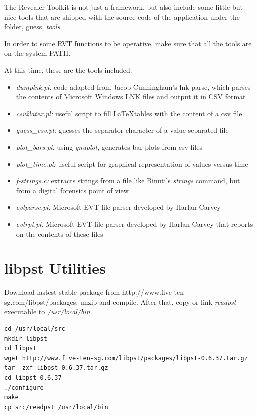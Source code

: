 \documentclass[a4paper,11pt,oneside]{report}
\begin{document}
The Revealer Toolkit is not just a framework, but also include some little but nice tools that are shipped with the source code of the application under the folder, guess, \emph{tools}. 

In order to some RVT functions to be operative, make sure that all the tools are on the system PATH.

At this time, these are the tools included:

\begin{itemize}
\item \emph{dumplnk.pl:} code adapted from Jacob Cunningham's lnk-parse, which parses the contents of Microsoft Windows LNK files and output it in CSV format
\item \emph{csv2latex.pl:} useful script to fill \LaTeX tables with the content of a csv file
\item \emph{guess\_csv.pl:} guesses the separator character of a value-separated file
\item \emph{plot\_bars.pl:} using \emph{gnuplot}, generates bar plots from csv files
\item \emph{plot\_time.pl:} useful script for graphical representation of values versus time
\item \emph{f-strings.c:} extracts strings from a file like Binutils \emph{strings}  command, but from a digital forensics point of view
\item \emph{evtparse.pl:} Microsoft EVT file parser developed by Harlan Carvey
\item \emph{evtrpt.pl:} Microsoft EVT file parser developed by Harlan Carvey that reports on the contents of these files
\end{itemize}




\section{libpst Utilities} \label{anx:libpst}

Download lastest stable package from http://www.five-ten-sg.com/libpst/packages, unzip and compile. After that, copy or link \emph{readpst} executable to \emph{/usr/local/bin}.

\begin{verbatim}
cd /usr/local/src
mkdir libpst
cd libpst
wget http://www.five-ten-sg.com/libpst/packages/libpst-0.6.37.tar.gz
tar -zxf libpst-0.6.37.tar.gz
cd libpst-0.6.37
./configure
make
cp src/readpst /usr/local/bin
\end{verbatim}
\end{document}
